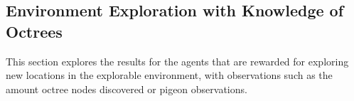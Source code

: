             
            
            
            
    
            
            
    
    

    \subsection{Environment Exploration with Knowledge of Octrees}
        
        This section explores the results for the agents that are rewarded for exploring new locations in the explorable environment, with observations such as the amount octree nodes discovered or pigeon observations. 
        
